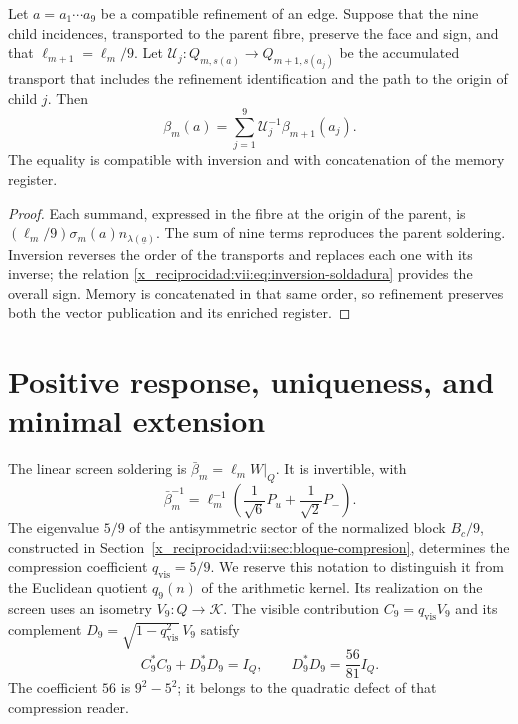 \begin{proposition}
\label{x_reciprocidad:vii:prop:refinamiento-soldadura}
Let \(a=a_1\cdots a_9\) be a compatible refinement of an edge.
Suppose that the nine child incidences, transported to the parent
fibre, preserve the face and sign, and that
\(\ell_{m+1}=\ell_m/9\). Let
\(\mathcal U_j:Q_{m,s(a)}\longrightarrow Q_{m+1,s(a_j)}\)
be the accumulated transport that includes the refinement identification
and the path to the origin of child \(j\). Then
\[
 \beta_m(a)=
 \sum_{j=1}^{9}\mathcal U_j^{-1}\beta_{m+1}(a_j).
\]
The equality is compatible with inversion and with concatenation
of the memory register.
\end{proposition}

\begin{proof}
Each summand, expressed in the fibre at the origin of the parent, is
\((\ell_m/9)\sigma_m(a)n_{\lambda(\underline a)}\).
The sum of nine terms reproduces the parent soldering.
Inversion reverses the order of the transports and replaces each one
with its inverse; the relation \eqref{x_reciprocidad:vii:eq:inversion-soldadura} provides
the overall sign. Memory is concatenated in that same order, so
refinement preserves both the vector publication and its
enriched register.
\end{proof}

\section{Positive response, uniqueness, and minimal extension}
\label{x_reciprocidad:vii:sec:respuesta-positiva}

The linear screen soldering is
\(\bar\beta_m=\ell_mW|_Q\). It is invertible, with
\[
 \bar\beta_m^{-1}
 =\ell_m^{-1}\left(\frac1{\sqrt6}P_u+\frac1{\sqrt2}P_-\right).
\]
The eigenvalue \(5/9\) of the antisymmetric sector of the normalized block
\(B_c/9\), constructed in Section~\ref{x_reciprocidad:vii:sec:bloque-compresion},
determines the compression
coefficient \(q_{\mathrm{vis}}=5/9\). We reserve this notation to
distinguish it from the Euclidean quotient \(q_9(n)\) of the arithmetic kernel.
Its realization on the screen uses an isometry
\(V_9:Q\longrightarrow\mathcal K\). The visible contribution
\(C_9=q_{\mathrm{vis}}V_9\) and its complement
\(D_9=\sqrt{1-q_{\mathrm{vis}}^2}\,V_9\) satisfy
\[
 C_9^*C_9+D_9^*D_9=I_Q,\qquad D_9^*D_9=\frac{56}{81}I_Q.
\]
The coefficient \(56\) is \(9^2-5^2\); it belongs to the quadratic defect
of that compression reader.

